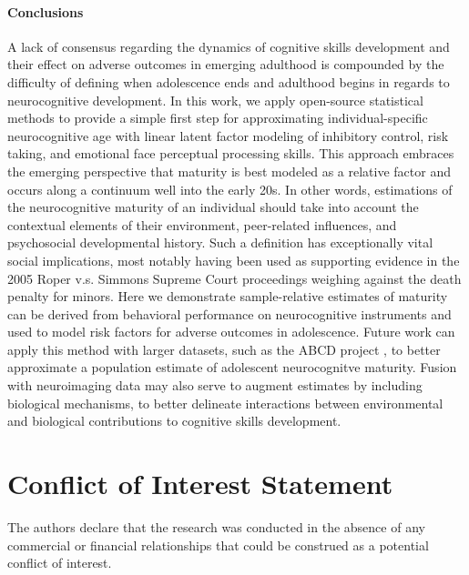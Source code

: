 \documentclass[utf8]{frontiersSCNS} %
\begin{document}
\paragraph*{Conclusions} A lack of consensus regarding the dynamics of cognitive skills development and their effect on adverse outcomes in emerging adulthood is compounded by the difficulty of defining when adolescence ends and adulthood begins in regards to neurocognitive development. In this work, we apply open-source statistical methods to provide a simple first step for approximating individual-specific neurocognitive age with linear latent factor modeling of inhibitory control, risk taking, and emotional face perceptual processing skills. This approach embraces the emerging perspective that maturity is best modeled as a relative factor and occurs along a continuum well into the early 20s. In other words, estimations of the neurocognitive maturity of an individual should take into account the contextual elements of their environment, peer-related influences, and psychosocial developmental history. Such a definition has exceptionally vital social implications, most notably having been used as supporting evidence in the 2005 Roper v.s. Simmons Supreme Court proceedings weighing against the death penalty for minors. Here we demonstrate sample-relative estimates of maturity can be derived from behavioral performance on neurocognitive instruments and used to model risk factors for adverse outcomes in adolescence. Future work can apply this method with larger datasets, such as the ABCD project \citep{casey2018adolescent,volkow2018conception}, to better approximate a population estimate of adolescent neurocognitve maturity. Fusion with neuroimaging data may also serve to augment estimates by including biological mechanisms, to better delineate interactions between environmental and biological contributions to cognitive skills development.

\section*{Conflict of Interest Statement}
The authors declare that the research was conducted in the absence of any commercial or financial relationships that could be construed as a potential conflict of interest.
\end{document}
